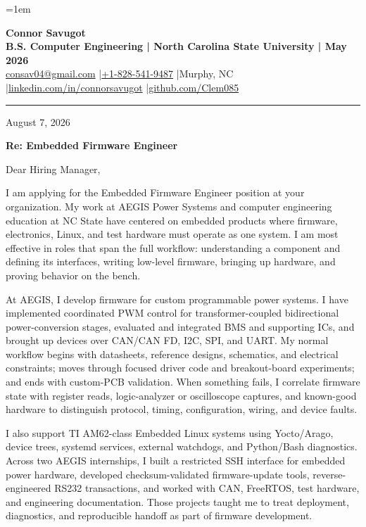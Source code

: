 \documentclass[10pt,letterpaper]{article}
\newcommand{\LetterDate}{August 7, 2026}
\newcommand{\TargetRole}{Embedded Firmware Engineer}
\newcommand{\TargetCompany}{your organization}
\begin{document}
\fontsize{10.5}{13.1}\selectfont
\RaggedRight
\setlength{\RaggedRightRightskip}{0pt plus 5em}
\emergencystretch=1em

\begin{center}
  {\fontsize{22}{23}\selectfont\bfseries Connor Savugot}\\[2pt]
  {\bfseries B.S. Computer Engineering | North Carolina State University | May 2026}\\[2pt]
  {\fontsize{9.7}{10.5}\selectfont
    \href{mailto:consav04@gmail.com}{consav04@gmail.com}
    \enspace|\enspace \href{tel:+18285419487}{+1-828-541-9487}
    \enspace|\enspace Murphy, NC
    \enspace|\enspace \href{https://linkedin.com/in/connorsavugot}{linkedin.com/in/connorsavugot}
    \enspace|\enspace \href{https://github.com/Clem085}{github.com/Clem085}}
\end{center}

\vspace{-0.15em}
\hrule
\vspace{0.9em}

\LetterDate

\textbf{Re: \TargetRole}

Dear Hiring Manager,

I am applying for the \TargetRole{} position at \TargetCompany. My work at AEGIS Power Systems and computer engineering education at NC State have centered on embedded products where firmware, electronics, Linux, and test hardware must operate as one system. I am most effective in roles that span the full workflow: understanding a component and defining its interfaces, writing low-level firmware, bringing up hardware, and proving behavior on the bench.

At AEGIS, I develop firmware for custom programmable power systems. I have implemented coordinated PWM control for transformer-coupled bidirectional power-conversion stages, evaluated and integrated BMS and supporting ICs, and brought up devices over CAN/CAN FD, I2C, SPI, and UART. My normal workflow begins with datasheets, reference designs, schematics, and electrical constraints; moves through focused driver code and breakout-board experiments; and ends with custom-PCB validation. When something fails, I correlate firmware state with register reads, logic-analyzer or oscilloscope captures, and known-good hardware to distinguish protocol, timing, configuration, wiring, and device faults.

I also support TI AM62-class Embedded Linux systems using Yocto/Arago, device trees, systemd services, external watchdogs, and Python/Bash diagnostics. Across two AEGIS internships, I built a restricted SSH interface for embedded power hardware, developed checksum-validated firmware-update tools, reverse-engineered RS232 transactions, and worked with CAN, FreeRTOS, test hardware, and engineering documentation. Those projects taught me to treat deployment, diagnostics, and reproducible handoff as part of firmware development.
\end{document}
